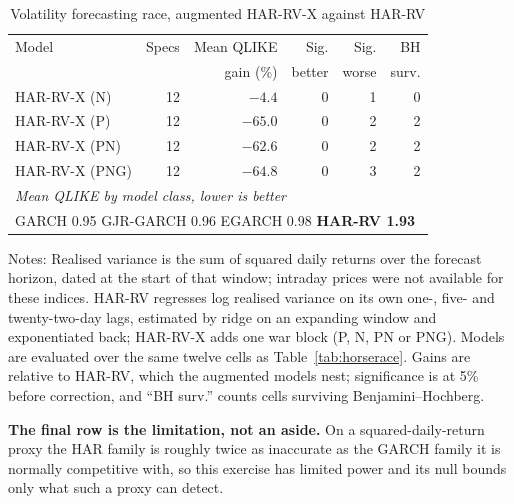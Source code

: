 \documentclass[12pt,a4paper]{article}
\newcommand{\compact}{\setlength{\tabcolsep}{3.5pt}\small}
\begin{document}
\begin{table}[htbp]
\centering
\caption{Volatility forecasting race, augmented HAR-RV-X against HAR-RV}
\label{tab:volrace}
\begin{threeparttable}
\compact
\begin{tabular}{lrrrrr}
\toprule
Model & Specs & Mean QLIKE & Sig. & Sig. & BH \\
      &       & gain (\%)  & better & worse & surv. \\
\midrule
HAR-RV-X (N)   & 12 & $-4.4$  & 0 & 1 & 0 \\
HAR-RV-X (P)   & 12 & $-65.0$ & 0 & 2 & 2 \\
HAR-RV-X (PN)  & 12 & $-62.6$ & 0 & 2 & 2 \\
HAR-RV-X (PNG) & 12 & $-64.8$ & 0 & 3 & 2 \\
\midrule
\multicolumn{6}{l}{\textit{Mean QLIKE by model class, lower is better}} \\
\multicolumn{6}{l}{GARCH 0.95 \quad GJR-GARCH 0.96 \quad EGARCH 0.98 \quad \textbf{HAR-RV 1.93}} \\
\bottomrule
\end{tabular}
\begin{tablenotes}
\footnotesize
\item Notes: Realised variance is the sum of squared daily returns over the forecast horizon, dated at the start of that window; intraday prices were not available for these indices. HAR-RV regresses log realised variance on its own one-, five- and twenty-two-day lags, estimated by ridge on an expanding window and exponentiated back; HAR-RV-X adds one war block (P, N, PN or PNG). Models are evaluated over the same twelve cells as Table~\ref{tab:horserace}. Gains are relative to HAR-RV, which the augmented models nest; significance is at 5\% before correction, and ``BH surv.'' counts cells surviving Benjamini--Hochberg.
\item \textbf{The final row is the limitation, not an aside.} On a squared-daily-return proxy the HAR family is roughly twice as inaccurate as the GARCH family it is normally competitive with, so this exercise has limited power and its null bounds only what such a proxy can detect.
\end{tablenotes}
\end{threeparttable}
\end{table}
\end{document}
